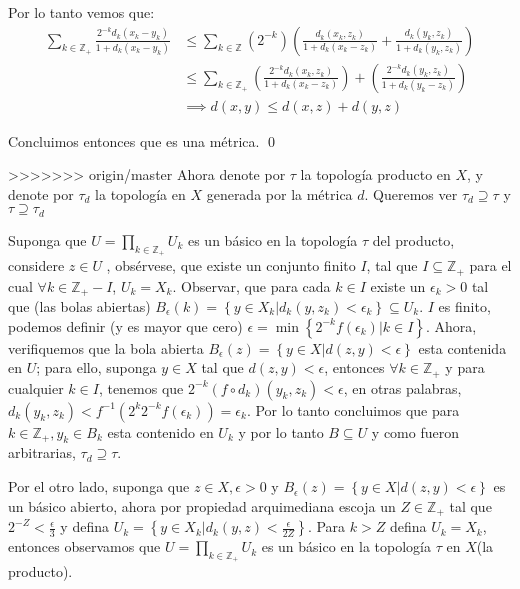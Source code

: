 \documentclass[]{article}
\newcommand{\lrp}[1]{\left( #1 \right)}
\newcommand{\set}[1]{\left\lbrace #1 \right\rbrace}
\newcommand{\ZZ}{\mathbb{Z}}
\newcommand{\contained}{\subseteq}
\begin{document}
Por lo tanto vemos que:
\begin{align*}
\sum_{k \in \ZZ_+}^{} \frac{2^{-k}d_k(x_k-y_k)}{1+d_k(x_k-y_k)} &\leq \sum_{k \in \ZZ}^{}\lrp{2^{-k}}\lrp{\frac{d_k(x_k,z_k)}{1+d_k(x_k - z_k)} + \frac{d_k(y_k,z_k)}{1+d_k(y_k,z_k)}}  \\
&\leq \sum_{k \in \ZZ_+}^{} \lrp{\frac{2^{-k}d_k(x_k,z_k)}{1+d_k(x_k - z_k)}} + \lrp{\frac{2^{-k}d_k(y_k,z_k)}{1+d_k(y_k - z_k)}} \\
&\implies d(x,y) \leq d(x,z) + d(y,z)
\end{align*}


Concluimos entonces que es una métrica. \qed


>>>>>>> origin/master
Ahora denote por $ \tau $ la topología producto  en $X$, y denote por $ \tau_d $ la topología en $X$ generada por la métrica $d$. Queremos ver $  \tau_d \supseteq \tau $ y $ \tau \supseteq \tau_d $

Suponga que $  U = \prod_{k \in \ZZ_+}^{}U_k $ es un básico en la topología $ \tau $ del producto, considere $ z \in U $ , obsérvese, que existe un conjunto finito $ I $, tal que $ I \contained \ZZ_+ $ para el cual $ \forall k \in \ZZ_+ - I $, $ U_k = X_k $.  Observar, que para cada $ k \in I $ existe un $ \epsilon_k > 0 $ tal que (las bolas abiertas) $ B_\epsilon(k) = \set{ y \in X_k | d_k(y,z_k) < \epsilon_k} \contained U_k$. $ I $ es finito, podemos definir (y es mayor que cero) $ \epsilon = \operatorname{min}\set{2^{-k} f(\epsilon_k)| k \in I} $. Ahora, verifiquemos que la bola abierta $ B_\epsilon(z) = \set{y \in X | d(z,y) < \epsilon} $ esta contenida en $ U $; para ello, suponga $ y \in X $ tal que $ d(z,y) < \epsilon $, entonces $ \forall k \in \ZZ_+ $ y para cualquier $ k \in I $, tenemos que $ 2^{-k}(f \circ d_k)(y_k,z_k)<\epsilon  $, en otras palabras, $ d_k(y_k,z_k) < f^{-1}(2^k2^{-k}f(\epsilon_k)) = \epsilon_k $. Por lo tanto concluimos que para $  k \in \ZZ_+, y_k \in B_k  $ esta contenido en $ U_k $ y por lo tanto $ B \contained U $ y como fueron arbitrarias, $ \tau_d \supseteq \tau $.

Por el otro lado, suponga que $ z \in X, \epsilon >0 $ y $ B_\epsilon(z) = \set{y \in X | d(z,y) < \epsilon} $ es un básico abierto, ahora por propiedad arquimediana escoja un $ Z \in \ZZ_+ $ tal que $ 2^{-Z} < \frac{\epsilon}{3} $ y defina $ U_k = \set{y \in X_k | d_k(y,z) < \frac{\epsilon}{2Z}} $. Para $ k > Z $ defina $ U_k = X_k $, entonces observamos que $ U = \prod_{k \in \ZZ_+}^{} U_k$ es un básico en la topología $ \tau $ en $ X $(la producto).
\end{document}
